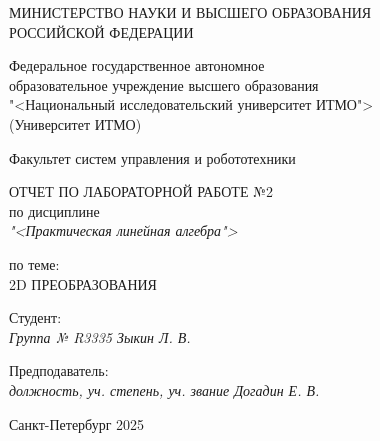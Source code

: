 \thispagestyle{empty}

\begin{center}
    МИНИСТЕРСТВО НАУКИ И ВЫСШЕГО ОБРАЗОВАНИЯ \\ РОССИЙСКОЙ ФЕДЕРАЦИИ

    \vspace{20pt}

    Федеральное государственное автономное \\ образовательное учреждение высшего образования \\
    "<Национальный исследовательский университет ИТМО"> \\
    (Университет ИТМО)

    \vspace{20pt}

    Факультет систем управления и робототехники
\end{center}

\vfill

\begin{center}
    ОТЧЕТ ПО ЛАБОРАТОРНОЙ РАБОТЕ №2\\  
    по дисциплине \\
    \textit{"<Практическая линейная алгебра">}

    \vspace{20pt}

    по теме: \\
    \uppercase{2D преобразования}
\end{center}

\vfill

    \noindent Студент: \\
    \textit{Группа № R3335 \hfill Зыкин Л. В.}

    \vspace{20pt}

    \noindent Предподаватель: \\
    \textit{должность, уч. степень, уч. звание \hfill Догадин Е. В.}

\vfill

\begin{center}
    Санкт-Петербург 2025
\end{center}